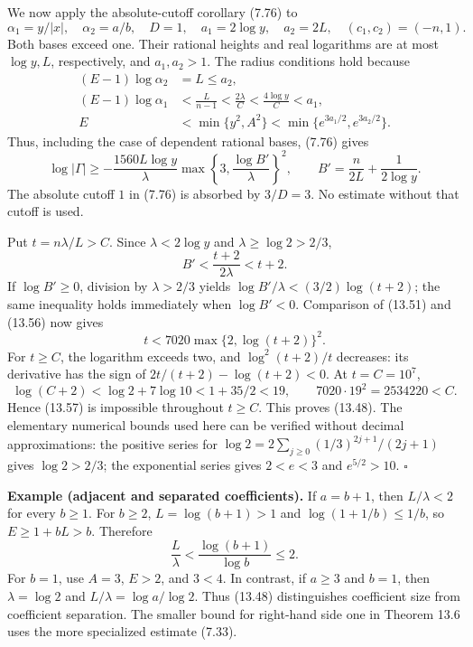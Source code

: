 \documentclass[
  11pt,
  a4paper,
]{article}
\begin{document}
We now apply the absolute-cutoff corollary (7.76) to \[
\alpha_1=y/|x|,\quad\alpha_2=a/b,\quad
D=1,\quad a_1=2\log y,\quad a_2=2L,\quad
(c_1,c_2)=(-n,1).
\] Both bases exceed one. Their rational heights and real logarithms are
at most \(\log y,L\), respectively, and \(a_1,a_2>1\). The radius
conditions hold because \[
\begin{aligned}
(E-1)\log\alpha_2&=L\le a_2,\\
(E-1)\log\alpha_1&<\frac{L}{n-1}
<\frac{2\lambda}{C}<\frac{4\log y}{C}<a_1,\\
E&<\min\{y^2,A^2\}<\min\{e^{3a_1/2},e^{3a_2/2}\}.
\end{aligned}
\tag{13.55}
\] Thus, including the case of dependent rational bases, (7.76) gives \[
\log|\Gamma|\ge
-\frac{1560L\log y}{\lambda}
\max\left\{3,\frac{\log B'}{\lambda}\right\}^{2},
\qquad
B'=\frac{n}{2L}+\frac1{2\log y}.
\tag{13.56}
\] The absolute cutoff \(1\) in (7.76) is absorbed by \(3/D=3\). No
estimate without that cutoff is used.

Put \(t=n\lambda/L>C\). Since \(\lambda<2\log y\) and
\(\lambda\ge\log2>2/3\), \[
B'<\frac{t+2}{2\lambda}<t+2.
\] If \(\log B'\ge0\), division by \(\lambda>2/3\) yields
\(\log B'/\lambda<(3/2)\log(t+2)\); the same inequality holds
immediately when \(\log B'<0\). Comparison of (13.51) and (13.56) now
gives \[
t<7020\max\{2,\log(t+2)\}^{2}.
\tag{13.57}
\] For \(t\ge C\), the logarithm exceeds two, and \(\log^2(t+2)/t\)
decreases: its derivative has the sign of \(2t/(t+2)-\log(t+2)<0\). At
\(t=C=10^7\), \[
\log(C+2)<\log2+7\log10<1+35/2<19,
\qquad 7020\cdot19^2=2534220<C.
\] Hence (13.57) is impossible throughout \(t\ge C\). This proves
(13.48). The elementary numerical bounds used here can be verified
without decimal approximations: the positive series for
\(\log2=2\sum_{j\ge0}(1/3)^{2j+1}/(2j+1)\) gives \(\log2>2/3\); the
exponential series gives \(2<e<3\) and \(e^{5/2}>10\). \(\square\)

\textbf{Example (adjacent and separated coefficients).} If \(a=b+1\),
then \(L/\lambda<2\) for every \(b\ge1\). For \(b\ge2\),
\(L=\log(b+1)>1\) and \(\log(1+1/b)\le1/b\), so \(E\ge1+bL>b\).
Therefore \[
\frac{L}{\lambda}<\frac{\log(b+1)}{\log b}\le2.
\tag{13.58}
\] For \(b=1\), use \(A=3\), \(E>2\), and \(3<4\). In contrast, if
\(a\ge3\) and \(b=1\), then \(\lambda=\log2\) and
\(L/\lambda=\log a/\log2\). Thus (13.48) distinguishes coefficient size
from coefficient separation. The smaller bound for right-hand side one
in Theorem 13.6 uses the more specialized estimate (7.33).
\end{document}
